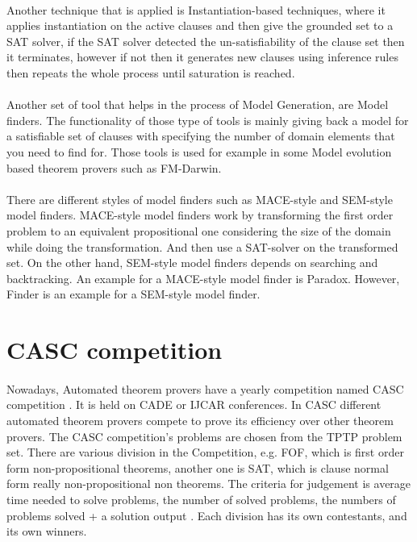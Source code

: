 \paragraph{}
Another technique that is applied is Instantiation-based techniques, where it applies instantiation on the active clauses and then give the grounded set to a SAT solver, if the SAT solver detected the un-satisfiability of the clause set then it terminates, however if not then it generates new clauses using inference rules then repeats the whole process until saturation is reached.

\paragraph{}
Another set of tool that helps in the process of Model Generation, are Model finders. The functionality of those type of tools is mainly giving back a model for a satisfiable set of clauses with specifying the number of domain elements that you need to find for. Those tools is used for example in some Model evolution based theorem provers such as FM-Darwin.

\paragraph{}
There are different styles of model finders such as MACE-style and SEM-style model finders. MACE-style model finders work by transforming the first order problem to an equivalent propositional one considering the size of the domain while doing the transformation. And then use a SAT-solver on the transformed set. On the other hand, SEM-style model finders depends on searching and backtracking. An example for a MACE-style model finder is Paradox. However, Finder is an example for a SEM-style model finder. \cite{MODEL_FINDER}      


\section{CASC competition}
\paragraph{}
Nowadays, Automated theorem provers have a yearly competition named CASC competition \cite{CASC02,CASC06}. It is held on CADE or IJCAR conferences. In CASC different automated theorem provers compete to prove its efficiency over other theorem provers. The CASC competition's problems are chosen from the TPTP problem set. There are various division in the Competition, e.g. FOF, which is first order form non-propositional theorems, another one is SAT, which is clause normal form really non-propositional non theorems.
The criteria for judgement is average time needed to solve problems, the number of solved problems, the numbers of problems solved + a solution output . Each division has its own contestants, and its own winners.


